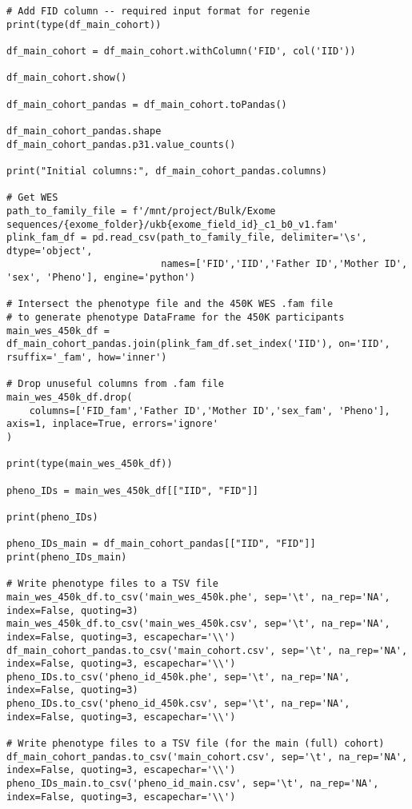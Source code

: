\documentclass[11pt]{article}
\begin{document}
\begin{lstlisting}[style=PythonStyle]
# Add FID column -- required input format for regenie 
print(type(df_main_cohort))

df_main_cohort = df_main_cohort.withColumn('FID', col('IID'))

df_main_cohort.show()

df_main_cohort_pandas = df_main_cohort.toPandas()

df_main_cohort_pandas.shape
df_main_cohort_pandas.p31.value_counts()

print("Initial columns:", df_main_cohort_pandas.columns)

# Get WES
path_to_family_file = f'/mnt/project/Bulk/Exome sequences/{exome_folder}/ukb{exome_field_id}_c1_b0_v1.fam'
plink_fam_df = pd.read_csv(path_to_family_file, delimiter='\s', dtype='object',                           
                           names=['FID','IID','Father ID','Mother ID', 'sex', 'Pheno'], engine='python')

# Intersect the phenotype file and the 450K WES .fam file
# to generate phenotype DataFrame for the 450K participants
main_wes_450k_df = df_main_cohort_pandas.join(plink_fam_df.set_index('IID'), on='IID', rsuffix='_fam', how='inner')

# Drop unuseful columns from .fam file
main_wes_450k_df.drop(
    columns=['FID_fam','Father ID','Mother ID','sex_fam', 'Pheno'], axis=1, inplace=True, errors='ignore'
)

print(type(main_wes_450k_df))

pheno_IDs = main_wes_450k_df[["IID", "FID"]]

print(pheno_IDs)

pheno_IDs_main = df_main_cohort_pandas[["IID", "FID"]]
print(pheno_IDs_main)

# Write phenotype files to a TSV file
main_wes_450k_df.to_csv('main_wes_450k.phe', sep='\t', na_rep='NA', index=False, quoting=3)
main_wes_450k_df.to_csv('main_wes_450k.csv', sep='\t', na_rep='NA', index=False, quoting=3, escapechar='\\')
df_main_cohort_pandas.to_csv('main_cohort.csv', sep='\t', na_rep='NA', index=False, quoting=3, escapechar='\\')
pheno_IDs.to_csv('pheno_id_450k.phe', sep='\t', na_rep='NA', index=False, quoting=3)
pheno_IDs.to_csv('pheno_id_450k.csv', sep='\t', na_rep='NA', index=False, quoting=3, escapechar='\\')

# Write phenotype files to a TSV file (for the main (full) cohort)
df_main_cohort_pandas.to_csv('main_cohort.csv', sep='\t', na_rep='NA', index=False, quoting=3, escapechar='\\')
pheno_IDs_main.to_csv('pheno_id_main.csv', sep='\t', na_rep='NA', index=False, quoting=3, escapechar='\\')


\end{lstlisting}
\end{document}
